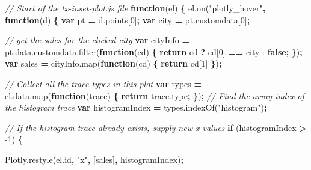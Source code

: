 \documentclass[
  12pt,
]{krantz}
\newenvironment{Shaded}{\begin{snugshade}}{\end{snugshade}}
\newcommand{\AttributeTok}[1]{\textcolor[rgb]{0.77,0.63,0.00}{#1}}
\newcommand{\CommentTok}[1]{\textcolor[rgb]{0.56,0.35,0.01}{\textit{#1}}}
\newcommand{\ControlFlowTok}[1]{\textcolor[rgb]{0.13,0.29,0.53}{\textbf{#1}}}
\newcommand{\DecValTok}[1]{\textcolor[rgb]{0.00,0.00,0.81}{#1}}
\newcommand{\KeywordTok}[1]{\textcolor[rgb]{0.13,0.29,0.53}{\textbf{#1}}}
\newcommand{\NormalTok}[1]{#1}
\newcommand{\OperatorTok}[1]{\textcolor[rgb]{0.81,0.36,0.00}{\textbf{#1}}}
\newcommand{\StringTok}[1]{\textcolor[rgb]{0.31,0.60,0.02}{#1}}
\newcommand{\VariableTok}[1]{\textcolor[rgb]{0.00,0.00,0.00}{#1}}
\begin{document}
\begin{Shaded}
\begin{Highlighting}[]
\CommentTok{// Start of the tx-inset-plot.js file}
\KeywordTok{function}\NormalTok{(el) }\OperatorTok{\{}
  \VariableTok{el}\NormalTok{.}\AttributeTok{on}\NormalTok{(}\StringTok{"plotly_hover"}\OperatorTok{,} \KeywordTok{function}\NormalTok{(d) }\OperatorTok{\{}
    \KeywordTok{var}\NormalTok{ pt }\OperatorTok{=} \VariableTok{d}\NormalTok{.}\AttributeTok{points}\NormalTok{[}\DecValTok{0}\NormalTok{]}\OperatorTok{;}
    \KeywordTok{var}\NormalTok{ city }\OperatorTok{=} \VariableTok{pt}\NormalTok{.}\AttributeTok{customdata}\NormalTok{[}\DecValTok{0}\NormalTok{]}\OperatorTok{;}

    \CommentTok{// get the sales for the clicked city}
    \KeywordTok{var}\NormalTok{ cityInfo }\OperatorTok{=} \VariableTok{pt}\NormalTok{.}\VariableTok{data}\NormalTok{.}\VariableTok{customdata}\NormalTok{.}\AttributeTok{filter}\NormalTok{(}\KeywordTok{function}\NormalTok{(cd) }\OperatorTok{\{}
      \ControlFlowTok{return}\NormalTok{ cd }\OperatorTok{?}\NormalTok{ cd[}\DecValTok{0}\NormalTok{] }\OperatorTok{==}\NormalTok{ city : }\KeywordTok{false}\OperatorTok{;}
    \OperatorTok{\}}\NormalTok{)}\OperatorTok{;}
    \KeywordTok{var}\NormalTok{ sales }\OperatorTok{=} \VariableTok{cityInfo}\NormalTok{.}\AttributeTok{map}\NormalTok{(}\KeywordTok{function}\NormalTok{(cd) }\OperatorTok{\{} \ControlFlowTok{return}\NormalTok{ cd[}\DecValTok{1}\NormalTok{] }\OperatorTok{\}}\NormalTok{)}\OperatorTok{;}

    \CommentTok{// Collect all the trace types in this plot}
    \KeywordTok{var}\NormalTok{ types }\OperatorTok{=} \VariableTok{el}\NormalTok{.}\VariableTok{data}\NormalTok{.}\AttributeTok{map}\NormalTok{(}\KeywordTok{function}\NormalTok{(trace) }\OperatorTok{\{} \ControlFlowTok{return} \VariableTok{trace}\NormalTok{.}\AttributeTok{type}\OperatorTok{;} \OperatorTok{\}}\NormalTok{)}\OperatorTok{;}
    \CommentTok{// Find the array index of the histogram trace}
    \KeywordTok{var}\NormalTok{ histogramIndex }\OperatorTok{=} \VariableTok{types}\NormalTok{.}\AttributeTok{indexOf}\NormalTok{(}\StringTok{"histogram"}\NormalTok{)}\OperatorTok{;}

    \CommentTok{// If the histogram trace already exists, supply new x values}
    \ControlFlowTok{if}\NormalTok{ (histogramIndex }\OperatorTok{>} \DecValTok{-1}\NormalTok{) }\OperatorTok{\{}

      \VariableTok{Plotly}\NormalTok{.}\AttributeTok{restyle}\NormalTok{(}\VariableTok{el}\NormalTok{.}\AttributeTok{id}\OperatorTok{,} \StringTok{"x"}\OperatorTok{,}\NormalTok{ [sales]}\OperatorTok{,}\NormalTok{ histogramIndex)}\OperatorTok{;}


\end{Highlighting}
\end{Shaded}
\end{document}
